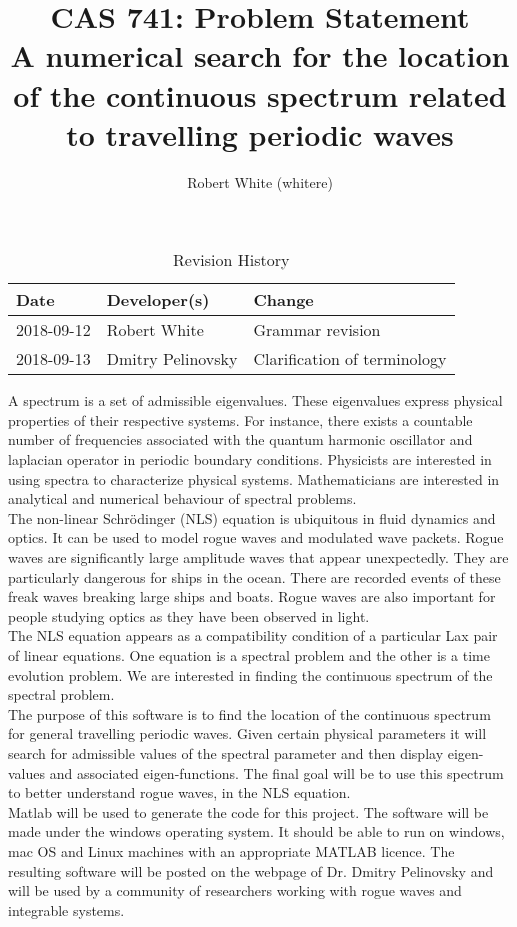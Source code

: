 \documentclass{article}
\title{CAS 741: Problem Statement\\A numerical search for the location of the continuous spectrum related to travelling periodic waves}
\author{Robert White (whitere)}
\date{}
\begin{document}
\maketitle
\begin{table}[hp]
\caption{Revision History} \label{TblRevisionHistory}
\begin{tabularx}{\textwidth}{llX}
\toprule
\textbf{Date} & \textbf{Developer(s)} & \textbf{Change}\\
\midrule
2018-09-12 & Robert White & Grammar revision \\
2018-09-13 & Dmitry Pelinovsky & Clarification of terminology\\
\bottomrule
\end{tabularx}
\end{table}

A spectrum is a set of admissible eigenvalues. These eigenvalues express physical properties of their respective systems. For instance, there exists a countable number of frequencies associated with the quantum harmonic oscillator and laplacian operator in periodic boundary conditions. Physicists are interested in using spectra to characterize physical systems. Mathematicians are interested in analytical and numerical behaviour of spectral problems.\\

The non-linear Schr\"{o}dinger (NLS) equation is ubiquitous in fluid dynamics and optics. It can be used to model rogue waves and modulated wave packets. Rogue waves are significantly large amplitude waves that appear unexpectedly. They are particularly dangerous for ships in the ocean. There are recorded events of these freak waves breaking large ships and boats. Rogue waves are also important for people studying optics as they have been observed in light. \\

The NLS equation appears as a compatibility condition of a particular Lax pair of linear equations. One equation is a spectral problem and the other is a time evolution problem. We are interested in finding the continuous spectrum of the spectral problem. \\

The purpose of this software is to find the location of the continuous spectrum for general travelling periodic waves. Given certain physical parameters it will search for admissible values of the spectral parameter and then display eigen-values and associated eigen-functions. The final goal will be to use this spectrum to better understand rogue waves, in the NLS equation.  \\ 

Matlab will be used to generate the code for this project. The software will be made under the windows operating system. It should be able to run on windows, mac OS and Linux machines with an appropriate MATLAB licence. The resulting software will be posted on the webpage of Dr. Dmitry Pelinovsky and will be used by a community of researchers working with rogue waves and integrable systems. 

\end{document}

